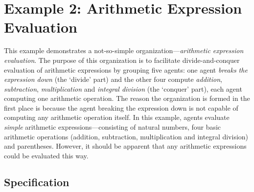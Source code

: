 
\section{Example 2: Arithmetic Expression Evaluation}

This example demonstrates a not-so-simple organization---\textit{arithmetic expression evaluation}.
The purpose of this organization is to facilitate divide-and-conquer evaluation of arithmetic expressions by grouping five agents: one agent \textit{breaks the expression down} (the `divide' part) and the other four compute \textit{addition}, \textit{subtraction}, \textit{multiplication} and \textit{integral division} (the `conquer' part), each agent computing one arithmetic operation.
The reason the organization is formed in the first place is because the agent breaking the expression down is not capable of computing any arithmetic operation itself.
In this example, agents evaluate \textit{simple} arithmetic expressions---consisting of natural numbers, four basic arithmetic operations (addition, subtraction, multiplication and integral division) and parentheses. However, it should be apparent that any arithmetic expressions could be evaluated this way.

\subsection*{Specification}


